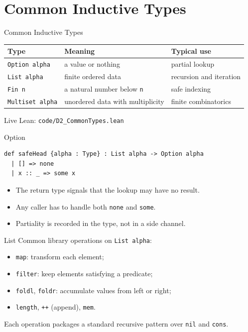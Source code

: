 ﻿\documentclass[aspectratio=169,11pt]{beamer}
\newcommand{\leanfile}[1]{\vfill{\small\color{gray}Live Lean: \texttt{#1}}}
\begin{document}
\section{Common Inductive Types}

\begin{frame}{Common Inductive Types}
  \begin{tabular}{@{}lll@{}}
    \toprule
    Type & Meaning & Typical use \\
    \midrule
    \texttt{Option alpha} & a value or nothing & partial lookup \\
    \texttt{List alpha} & finite ordered data & recursion and iteration \\
    \texttt{Fin n} & a natural number below \texttt{n} & safe indexing \\
    \texttt{Multiset alpha} & unordered data with multiplicity & finite combinatorics \\
    \bottomrule
  \end{tabular}

  \leanfile{code/D2\_CommonTypes.lean}
\end{frame}

\begin{frame}[fragile]{Option}
  \begin{lstlisting}
def safeHead {alpha : Type} : List alpha -> Option alpha
  | [] => none
  | x :: _ => some x
  \end{lstlisting}

  \begin{itemize}
    \item The return type signals that the lookup may have no result.
    \item Any caller has to handle both \texttt{none} and \texttt{some}.
    \item Partiality is recorded in the type, not in a side channel.
  \end{itemize}
\end{frame}

\begin{frame}{List}
  Common library operations on \texttt{List alpha}:

  \begin{itemize}
    \item \texttt{map}: transform each element;
    \item \texttt{filter}: keep elements satisfying a predicate;
    \item \texttt{foldl}, \texttt{foldr}: accumulate values from left or right;
    \item \texttt{length}, \texttt{++} (append), \texttt{mem}.
  \end{itemize}

  Each operation packages a standard recursive pattern over \texttt{nil} and \texttt{cons}.
\end{frame}
\end{document}
